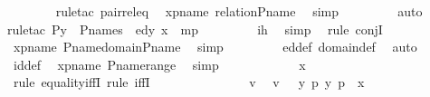\begin{isabellebody}
\ \ \ \ \ \ \isamarkupfalse%
\ {\isacharparenleft}{\kern0pt}rule{\isacharunderscore}{\kern0pt}tac\ pair{\isacharunderscore}{\kern0pt}rel{\isacharunderscore}{\kern0pt}eq{\isacharparenright}{\kern0pt}\ \isamarkupfalse%
\ xpname\ relation{\isacharunderscore}{\kern0pt}P{\isacharunderscore}{\kern0pt}name\ \isamarkupfalse%
\ simp\ \isanewline
\ \ \ \ \ \ \isamarkupfalse%
\ auto\ \isamarkupfalse%
{\isacharparenleft}{\kern0pt}rule{\isacharunderscore}{\kern0pt}tac\ P{\isacharequal}{\kern0pt}{\isachardoublequoteopen}y\ {\isasymin}\ P{\isacharunderscore}{\kern0pt}names\ {\isasymand}\ ed{\isacharparenleft}{\kern0pt}y{\isacharcomma}{\kern0pt}\ x{\isacharparenright}{\kern0pt}{\isachardoublequoteclose}\ \ mp{\isacharparenright}{\kern0pt}\ \isanewline
\ \ \ \ \ \ \isamarkupfalse%
\ ih\ \isamarkupfalse%
\ simp\ \isamarkupfalse%
\ {\isacharparenleft}{\kern0pt}rule\ conjI{\isacharparenright}{\kern0pt}\ \isamarkupfalse%
\ xpname\ P{\isacharunderscore}{\kern0pt}name{\isacharunderscore}{\kern0pt}domain{\isacharunderscore}{\kern0pt}P{\isacharunderscore}{\kern0pt}name\ \isamarkupfalse%
\ simp\ \isanewline
\ \ \ \ \ \ \isamarkupfalse%
\ ed{\isacharunderscore}{\kern0pt}def\ domain{\isacharunderscore}{\kern0pt}def\ \isamarkupfalse%
\ auto\ \isamarkupfalse%
\ id{\isacharunderscore}{\kern0pt}def\ \isamarkupfalse%
\ xpname\ P{\isacharunderscore}{\kern0pt}name{\isacharunderscore}{\kern0pt}range\ \isamarkupfalse%
\ simp\ \isamarkupfalse%
\ \isanewline
\ \ \ \ \isamarkupfalse%
\ \isamarkupfalse%
\ {\isachardoublequoteopen}{\isachardot}{\kern0pt}{\isachardot}{\kern0pt}{\isachardot}{\kern0pt}\ {\isacharequal}{\kern0pt}\ x{\isachardoublequoteclose}\ \ \ \isanewline
\ \ \ \ \ \ \isamarkupfalse%
\ {\isacharparenleft}{\kern0pt}rule\ equality{\isacharunderscore}{\kern0pt}iffI{\isacharsemicolon}{\kern0pt}\ rule\ iffI{\isacharparenright}{\kern0pt}\isanewline
\ \ \ \ \isamarkupfalse%
\ {\isacharminus}{\kern0pt}\ \isanewline
\ \ \ \ \ \ \isamarkupfalse%
\ v\ \isamarkupfalse%
\ {\isachardoublequoteopen}v\ {\isasymin}\ {\isacharbraceleft}{\kern0pt}\ {\isacharless}{\kern0pt}y{\isacharcomma}{\kern0pt}\ p{\isachargreater}{\kern0pt}{\isachardot}{\kern0pt}\ {\isacharless}{\kern0pt}y{\isacharcomma}{\kern0pt}\ p{\isachargreater}{\kern0pt}\ {\isasymin}\ x\ {\isacharbraceright}{\kern0pt}{\isachardoublequoteclose}\ \isanewline

\end{isabellebody}
